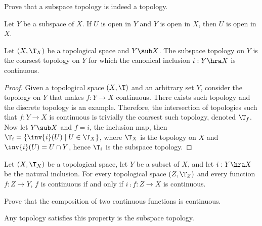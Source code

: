\documentclass[10pt]{article}
\begin{document}
\begin{problem}
    Prove that a subspace topology is indeed a topology.
\end{problem}
\begin{problem}
    Let $Y$ be a subspace of $X$. If $U$ is open in $Y$ and $Y$ is open in $X$, then $U$ is open in $X$.
\end{problem}
\begin{proposition}
    Let $(X,{\T}_{X})$ be a topological space and $Y\sub X$. The subspace topology on $Y$ is the coarsest topology on $Y$ for which the canonical inclusion $i:Y\hra X$ is continuous.
\end{proposition}
\begin{proof}
    Given a topological space $(X,{\T})$ and an arbitrary set $Y$, consider the topology on $Y$ that makes $f:Y\to X$ continuous. There exists such topology and the discrete topology is an example. Therefore, the intersection of topologies such that $f:Y\to X$ is continuous is trivially the coarsest such topology, denoted ${\T}_{f}$. Now let $Y\sub X$ and $f=i$, the inclusion map, then ${\T}_{i}=\{\inv{i}(U)\mid U\in{\T}_{X}\}$, where ${\T}_{X}$ is the topology on $X$ and $\inv{i}(U)=U\cap Y$, hence ${\T}_{i}$ is the subspace topology.
\end{proof}
\begin{Universal property for subspace topology}
    Let $(X,{\T}_{X})$ be a topological space, let $Y$ be a subset of $X$, and let $i: Y\hra X$ be the natural inclusion. For every topological space $(Z,{\T}_{Z})$ and every function $f:Z\to Y$, $f$ is continuous if and only if $i\comp f:Z\to X$ is continuous.
\end{Universal property for subspace topology}
\begin{center}
\end{center}
\begin{problem}
    Prove that the composition of two continuous functions is continuous.
\end{problem}
\begin{proposition}
    Any topology satisfies this property is the subspace topology.
\end{proposition}
\end{document}
